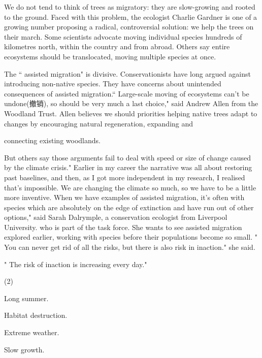 \documentclass{英语试卷}
\begin{document}
\par We do not tend to think of trees as migratory: they are slow-growing and rooted to the ground. Faced with this problem, the ecologist Charlie Gardner is one of a growing number proposing a radical, controversial solution: we help the trees on their march. Some scientists advocate moving individual species hundreds of kilometres north, within the country and from abroad. Others say entire ecosystems should be translocated, moving multiple species at once.\par
\par The “ assisted migration" is divisive. Conservationists have long argued against introducing non-native species. They have concerns about unintended consequences of assisted migration.“ Large-scale moving of ecosystems can't be undone(撤销), so should be very much a last choice," said Andrew Allen from the Woodland Trust. Allen believes we should priorities helping native trees adapt to changes by encouraging natural regeneration, expanding and\par
\par connecting existing woodlands.\par
\par But others say those arguments fail to deal with speed or size of change caused by the climate crisis." Earlier in my career the narrative was all about restoring past baselines, and then, as I got more independent in my research, I realised that's impossible. We are changing the climate so much, so we have to be a little more inventive. When we have examples of assisted migration, it's often with species which are absolutely on the edge of extinction and have run out of other options," said Sarah Dalrymple, a conservation ecologist from Liverpool University. who is part of the task force. She wants to see assisted migration explored earlier, working with species before their populations become so small. " You can never get rid of all the risks, but there is also risk in inaction." she said.\par
\par " The risk of inaction is increasing every day."\par
{}
\begin{choices}(2)
  \item Long summer.
  \item Habitat destruction.
  \item Extreme weather.
  \item Slow growth.
\end{choices}
\end{document}
